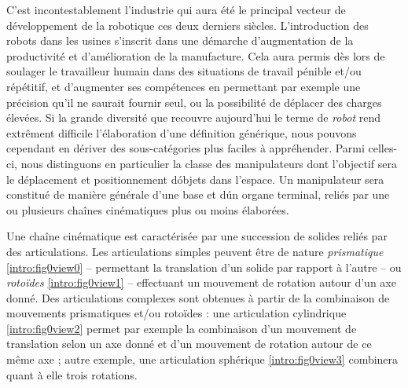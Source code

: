 C'est incontestablement l'industrie qui aura \'et\'e le principal vecteur de d\'eveloppe\-ment de la robotique ces deux derniers si\`ecles. L'introduction des robots dans les usines s'inscrit dans une d\'emarche d'augmentation de la productivit\'e et d'am\'elio\-ration de la manufacture. Cela aura permis d\`es lors de soulager le travailleur humain dans des situations de travail p\'enible et/ou r\'ep\'etitif, et d'augmenter ses comp\'etences en permettant par exemple une pr\'ecision qu'il ne saurait fournir seul, ou la possibilit\'e de d\'eplacer des charges \'elev\'ees. Si la grande diversit\'e que recouvre aujourd'hui le terme de {\it robot} rend extr\^ement difficile l'\'elaboration d'une d\'efinition g\'en\'erique, nous pouvons cependant en d\'eriver des sous-cat\'egories plus faciles \`a appr\'ehender. Parmi celles-ci, nous distinguons en particulier la classe des manipulateurs dont l'objectif sera le d\'eplacement et positionnement d\'objets dans l'espace. Un manipulateur sera constitu\'e de mani\`ere g\'en\'erale d'une base et d\'un organe terminal, reli\'es par une ou plusieurs cha\^ines cin\'ematiques plus ou moins \'elabor\'ees.

Une cha\^ine cin\'ematique est caract\'eris\'ee par une succession de solides reli\'es par des articulations. Les articulations simples peuvent \^etre de nature {\it prismatique} \ref{intro:fig0view0} -- permettant la translation d'un solide par rapport \`a l'autre -- ou {\it roto\"ides} \ref{intro:fig0view1} -- effectuant un mouvement de rotation autour d'un axe donn\'e. Des articulations complexes sont obtenues \`a partir de la combinaison de mouvements prismatiques et/ou roto\"ides : une articulation cylindrique \ref{intro:fig0view2} permet par exemple la combinaison d'un mouvement de translation selon un axe donn\'e et d'un mouvement de rotation autour de ce m\^eme axe ; autre exemple, une articulation sph\'erique \ref{intro:fig0view3} combinera quant \`a elle trois rotations.

